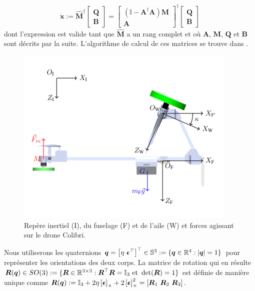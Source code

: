 \begin{align}
\label{eq:udwadia}
    \ddot{\boldsymbol{x}} := \hat{\boldsymbol{M}}^{\dag} \begin{bmatrix} \boldsymbol{Q} \\ \boldsymbol{B} \end{bmatrix}  = \begin{bmatrix} (\mathbb{I} - \boldsymbol{A}^{\dag}\boldsymbol{A})\boldsymbol{M} \\ \boldsymbol{A} \end{bmatrix}^{\dag} \begin{bmatrix} \boldsymbol{Q} \\ \boldsymbol{B} \end{bmatrix}
\end{align}
dont l'expression est valide tant que $\hat{\boldsymbol{M}}$ a un rang complet et où $\boldsymbol{A}$, $\boldsymbol{M}$, $\boldsymbol{Q}$ et $\boldsymbol{B}$ sont décrits par la suite. L'algorithme de calcul de ces matrices se trouve dans \cite{udwadia-schutte}.

\begin{figure}[ht!]
    \centering
    \includegraphics[width=0.6\columnwidth,angle=0,trim={0 0 0 0.5cm},clip]{figures/fram_side_colibri.png}
    \caption{Repère inertiel (I), du fuselage (F) et de l'aile (W) et forces agissant sur le drone Colibri.}
    \label{fig:colibri_frame_side}
\end{figure}
Nous utiliserons les quaternions $\boldsymbol{q} = \left[ \eta ~ \boldsymbol{\epsilon}^\top \right]^\top  \in {\mathbb S}^3:=\{ \boldsymbol{q}\in {\mathbb R}^4: |\boldsymbol{q}| = 1\}$ pour représenter les orientations des deux corps. La matrice de rotation qui en résulte $\boldsymbol{R}(\boldsymbol{q}) \in SO(3): = \{\boldsymbol{R}\in {\mathbb R}^{3\times 3}: \boldsymbol{R}^\top \boldsymbol{R} = \mathbb{I}_{3} \text{ et}~\det(\boldsymbol{R})=1\}$ est définie de manière unique comme $\boldsymbol{R}(\boldsymbol{q}) := \mathbb{I}_{3} +2\eta \left[\boldsymbol{\epsilon}\right]_{\times} + 2\left[\boldsymbol{\epsilon}\right]_{\times}^{2} = [\boldsymbol{R}_{1}~\boldsymbol{R}_{2}~\boldsymbol{R}_{3}]$.

